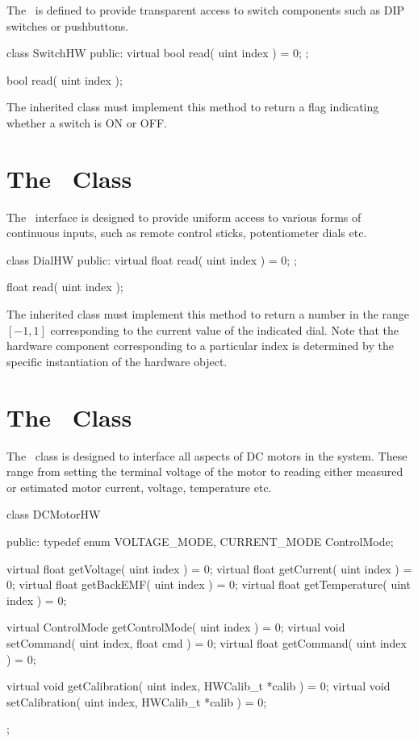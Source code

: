 The \SwitchHW\ is defined to provide transparent access to switch components 
such as DIP switches or pushbuttons.

\begin{classdef}
class SwitchHW {
public:
  virtual bool read( uint index ) = 0;
};
\end{classdef}

\begin{prototype}
bool read( uint index );
\end{prototype}

The inherited class must implement this method to return a flag indicating
whether a switch is ON or OFF.

\section{The \DialHW\ Class}
\label{sec:dial_class}

The \DialHW\ interface is designed to provide uniform access to various
forms of continuous inputs, such as remote control sticks, potentiometer
dials etc.

\begin{classdef}
class DialHW {
public:
  virtual float read( uint index ) = 0;
};
\end{classdef}

\begin{prototype}
float read( uint index );
\end{prototype}

The inherited class must implement this method to return a number in the
range $[-1, 1]$ corresponding to the current value of the indicated
dial. Note that the hardware component corresponding to a particular index
is determined by the specific instantiation of the hardware object.

\section{The \DCMotorHW\ Class}
\label{sec:dcmotor_class}

The \DCMotorHW\ class is designed to interface all aspects of DC motors
in the system. These range from setting the terminal voltage of the motor to 
reading either measured or estimated motor current, voltage, temperature etc.

\begin{classdef}
class DCMotorHW {
public:
  typedef enum { VOLTAGE_MODE, CURRENT_MODE } ControlMode;
  
  virtual float getVoltage( uint index ) = 0;
  virtual float getCurrent( uint index ) = 0;
  virtual float getBackEMF( uint index ) = 0;
  virtual float getTemperature( uint index ) = 0;

  virtual ControlMode getControlMode( uint index ) = 0;
  virtual void setCommand( uint index, float cmd ) = 0;
  virtual float getCommand( uint index ) = 0;

  virtual void getCalibration( uint index, HWCalib_t *calib ) = 0;
  virtual void setCalibration( uint index, HWCalib_t *calib ) = 0;
  
};
\end{classdef}

